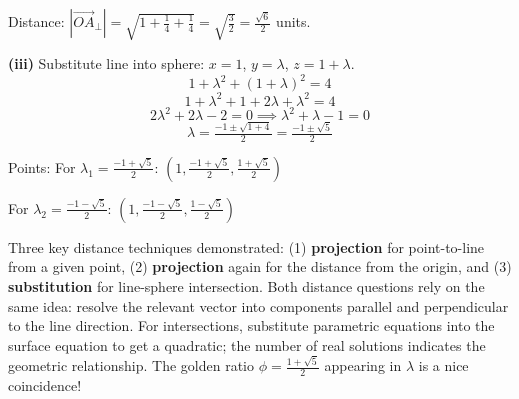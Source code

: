 \begin{solution}
Distance: $|\vec{OA}_{\perp}| = \sqrt{1 + \tfrac{1}{4} + \tfrac{1}{4}} = \sqrt{\tfrac{3}{2}} = \tfrac{\sqrt{6}}{2}$ units.
\vspace{-2mm}

\textbf{(iii)} Substitute line into sphere: $x = 1$, $y = \lambda$, $z = 1 + \lambda$.
$$1 + \lambda^2 + (1+\lambda)^2 = 4$$
$$1 + \lambda^2 + 1 + 2\lambda + \lambda^2 = 4$$
$$2\lambda^2 + 2\lambda - 2 = 0 \implies \lambda^2 + \lambda - 1 = 0$$
$$\lambda = \tfrac{-1 \pm \sqrt{1+4}}{2} = \tfrac{-1 \pm \sqrt{5}}{2}$$
\vspace{-2mm}

Points: For $\lambda_1 = \tfrac{-1+\sqrt{5}}{2}$: $(1, \tfrac{-1+\sqrt{5}}{2}, \tfrac{1+\sqrt{5}}{2})$

For $\lambda_2 = \tfrac{-1-\sqrt{5}}{2}$: $(1, \tfrac{-1-\sqrt{5}}{2}, \tfrac{1-\sqrt{5}}{2})$
\end{solution}

\begin{takeaways}
Three key distance techniques demonstrated: (1) \textbf{projection} for point-to-line from a given point, (2) \textbf{projection} again for the distance from the origin, and (3) \textbf{substitution} for line-sphere intersection. Both distance questions rely on the same idea: resolve the relevant vector into components parallel and perpendicular to the line direction. For intersections, substitute parametric equations into the surface equation to get a quadratic; the number of real solutions indicates the geometric relationship. The golden ratio $\phi = \tfrac{1+\sqrt{5}}{2}$ appearing in $\lambda$ is a nice coincidence!
\end{takeaways}

\vspace{1em}

